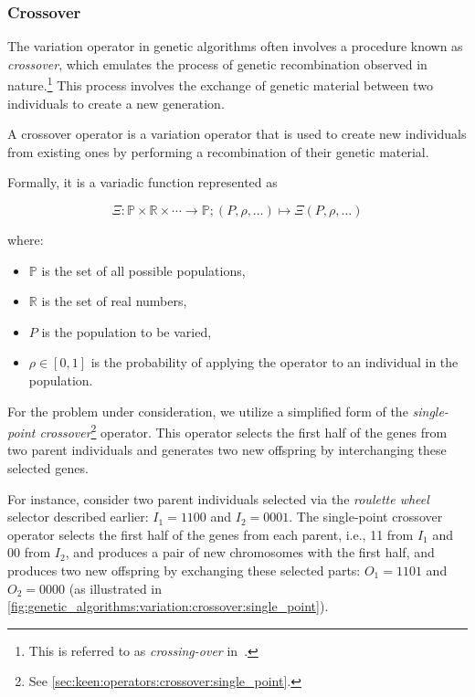 \subsubsection{Crossover}
\label{sec:genetic_algorithms:variation:crossover}
  The variation operator in genetic algorithms often involves a procedure known as \emph{crossover},
  which emulates the process of genetic recombination observed in nature.\footnote{
    This is referred to as \emph{crossing-over} 
    in~\autocite{hollandAdaptationNaturalArtificial1992a}.
  }
  This process involves the exchange of genetic material between two individuals to create a new 
  generation.

  \begin{definition}
  \label{def:crossover_operator}
    A crossover operator is a variation operator that is used to create new individuals from 
    existing ones by performing a recombination of their genetic material.

    Formally, it is a variadic function represented as 
    
    \[
      \Xi : \mathbb{P} \times \mathbb{R} \times \cdots \to \mathbb{P};
      (P, \rho, \dots) \mapsto \Xi(P, \rho, \dots)
    \]
    
    where:

    \begin{itemize}
      \item \(\mathbb{P}\) is the set of all possible populations,
      \item \(\mathbb{R}\) is the set of real numbers,
      \item \(P\) is the population to be varied,
      \item \(\rho \in [0, 1]\) is the probability of applying the operator to an individual in the 
        population.
    \end{itemize}

  \end{definition}

  For the problem under consideration, we utilize a simplified form of the \emph{single-point 
  crossover}\footnote{See \vref{sec:keen:operators:crossover:single_point}.} operator. 
  This operator selects the first half of the genes from two parent individuals and generates two 
  new offspring by interchanging these selected genes.
  
  For instance, consider two parent individuals selected via the \emph{roulette wheel} selector 
  described earlier: \(I_1 = 1100\) and \(I_2 = 0001\).
  The single-point crossover operator selects the first half of the genes from each parent, i.e., 11
  from \(I_1\) and 00 from \(I_2\), and produces a pair of new chromosomes with the first half, and 
  produces two new offspring by exchanging these selected parts: \(O_1 = 1101\) and \(O_2 = 0000\) 
  (as illustrated in \vref{fig:genetic_algorithms:variation:crossover:single_point}).

